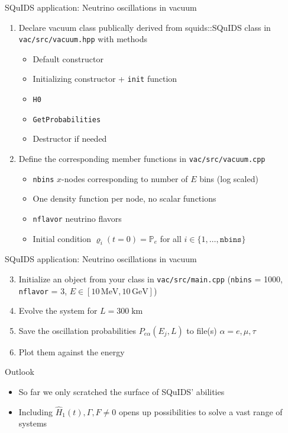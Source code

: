 \documentclass[]{beamer}
\begin{document}
\begin{frame}{SQuIDS application: Neutrino oscillations in vacuum}
  \begin{enumerate}
    \item Declare vacuum class publically derived from squids::SQuIDS class in \texttt{vac/src/vacuum.hpp} with methods
    \begin{itemize}
      \item Default constructor
      \item Initializing constructor + \texttt{init} function
      \item \texttt{H0}
      \item \texttt{GetProbabilities}
      \item Destructor if needed
    \end{itemize}
    \item Define the corresponding member functions in \texttt{vac/src/vacuum.cpp}
    \begin{itemize}
      \item \texttt{nbins} \(x\)-nodes corresponding to number of \(E\) bins (log scaled)
      \item One density function per node, no scalar functions
      \item \texttt{nflavor} neutrino flavors
      \item Initial condition \(\varrho_i(t = 0) = \mathbb{P}_{e}\) for all \(i \in \{1, \ldots,\texttt{nbins}\}\)
    \end{itemize}
  \end{enumerate}
\end{frame}

\begin{frame}{SQuIDS application: Neutrino oscillations in vacuum}
  \begin{enumerate}
    \setcounter{enumi}{2}
    \item Initialize an object from your class in \texttt{vac/src/main.cpp} (\texttt{nbins} = 1000, \texttt{nflavor} = 3, \(E \in [10 \,\mathrm{MeV}, 10 \,\mathrm{GeV}]\))
    \item Evolve the system for \(L = 300 \; \mathrm{km}\)
    \item Save the oscillation probabilities \(P_{e\alpha}(E_j, L)\) to file(s) \(\alpha = e, \mu, \tau\)
    \item Plot them against the energy
  \end{enumerate}
\end{frame}

\begin{frame}{Outlook}
  \begin{itemize}
    \item So far we only scratched the surface of SQuIDS' abilities
    \item Including \(\hat{H}_1(t), \Gamma, F \neq 0\) opens up possibilities to solve a vast range of systems
  \end{itemize}
\end{frame}
\end{document}
